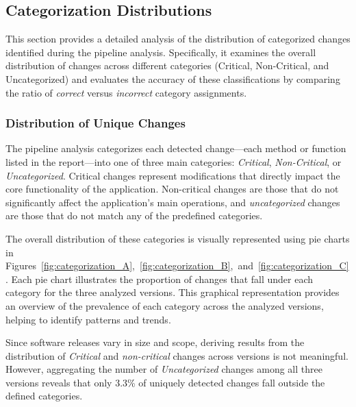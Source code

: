 \subsection{Categorization Distributions}

This section provides a detailed analysis of the distribution of categorized changes identified during the pipeline analysis. Specifically, it examines the overall distribution of changes across different categories (Critical, Non-Critical, and Uncategorized) and evaluates the accuracy of these classifications by comparing the ratio of \textit{correct} versus \textit{incorrect} category assignments.

\subsubsection{Distribution of Unique Changes}

The pipeline analysis categorizes each detected change—each method or function listed in the report—into one of three main categories: \textit{Critical}, \textit{Non-Critical}, or \textit{Uncategorized}. Critical changes represent modifications that directly impact the core functionality of the application. Non-critical changes are those that do not significantly affect the application’s main operations, and \textit{uncategorized} changes are those that do not match any of the predefined categories.

The overall distribution of these categories is visually represented using pie charts in Figures~\ref{fig:categorization_A},~\ref{fig:categorization_B},~and~\ref{fig:categorization_C}. Each pie chart illustrates the proportion of changes that fall under each category for the three analyzed versions. This graphical representation provides an overview of the prevalence of each category across the analyzed versions, helping to identify patterns and trends.

Since software releases vary in size and scope, deriving results from the distribution of \textit{Critical} and \textit{non-critical} changes across versions is not meaningful. However, aggregating the number of \textit{Uncategorized} changes among all three versions reveals that only 3.3\%  of uniquely detected changes fall outside the defined categories.

